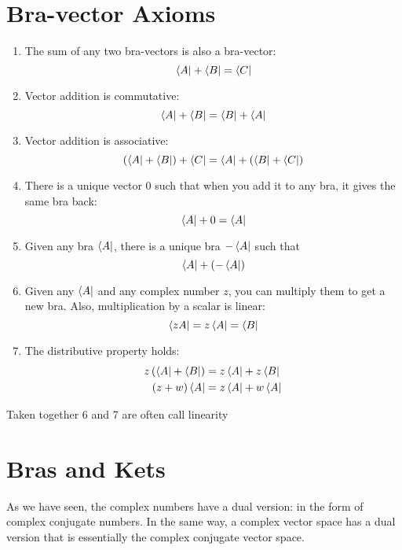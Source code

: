 \documentclass[12pt,a4paper,twocolumn]{article}
\begin{document}
\section{Bra-vector Axioms}
\begin{enumerate}
    \item The sum of any two bra-vectors is also a bra-vector:
    \begin{equation}
        \bra{A}  + \bra{B} = \bra{C}
    \end{equation}
    \item Vector addition is commutative:
    \begin{equation}
        \bra{ A } +\bra{ B } =\bra{B} +\bra{A}
    \end{equation}
    \item Vector addition is associative:
    \begin{equation}
        \left(\bra{ A } +\bra{ B }\right)+\bra{ C } =\bra{ A } +  \left(\bra{B }+\bra{ C }\right)
    \end{equation}
    \item There is a unique vector $0$ such that when you add it to any bra, it gives the same bra back:
    \begin{equation}
       \bra{ A } + 0 =\bra{ A }
    \end{equation}
    \item Given any bra $\bra{A}$, there is a unique bra $-\bra{A}$ such that
    \begin{equation}
       \bra{A} + \left( -\bra{A} \right)
    \end{equation}
    \item Given any $\bra{A}$ and any complex number $z$, you can multiply them to get a new bra. Also, multiplication by a scalar is linear:
    \begin{equation}
       \bra{zA} = z\bra{ A } =\bra{B}
    \end{equation}
    \item The distributive property holds:
    \begin{align}
        z\left(\bra{A} +\bra{B}\right) &=  z\bra{A} + z\bra{B}\\
        \left( z+w\right)\bra{A} &= z\bra{A} + w\bra{A}
    \end{align}
\end{enumerate}
Taken together 6 and 7 are often call linearity
\section{Bras and Kets}
As we have seen, the complex numbers have a dual version: in the form of complex conjugate numbers. In the same way, a complex vector space has a dual version that is essentially the complex conjugate vector space.
\end{document}
